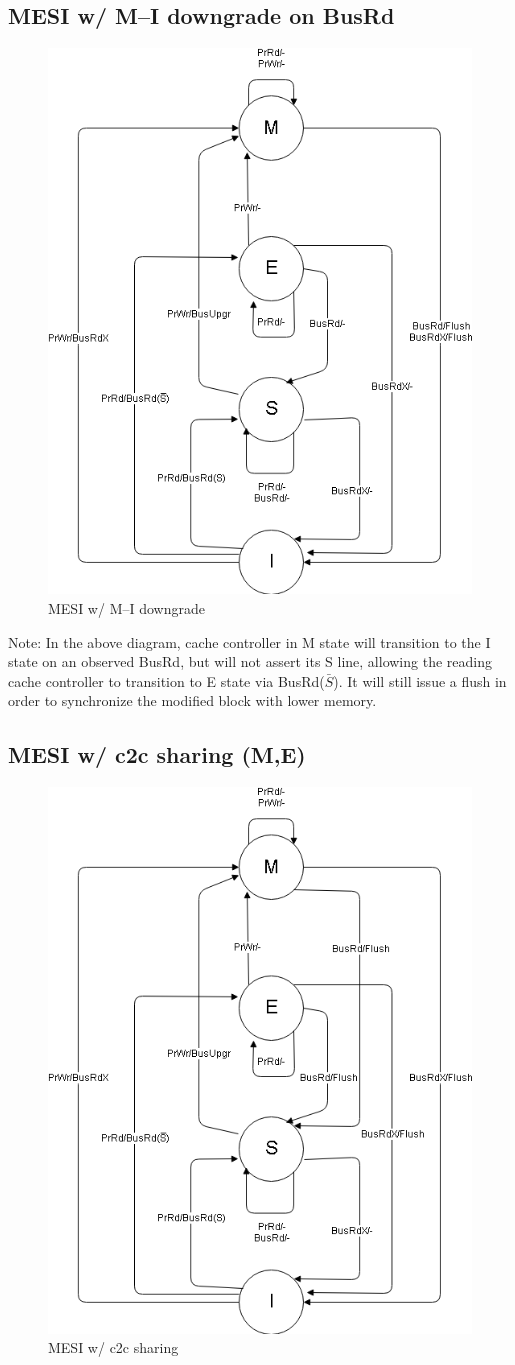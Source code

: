 \documentclass[12pt, letterpaper]{report}
\begin{document}
\subsection{MESI w/ M--I downgrade on BusRd}

\begin{figure}[H]
	\centering
	\includegraphics[width=0.4\columnwidth]{mesi_no_c2c_mi.png}
	\caption{MESI w/ M--I downgrade}
\end{figure}

Note: In the above diagram, cache controller in M state will transition to the I state on an observed BusRd, but will not assert its S line, allowing the reading cache controller to transition to E state via BusRd($\bar{S}$). It will still issue a flush in order to synchronize the modified block with lower memory.

\subsection{MESI w/ c2c sharing (M,E)}

\begin{figure}[H]
	\centering
	\includegraphics[width=0.4\columnwidth]{mesi_c2c.png}
	\caption{MESI w/ c2c sharing}
\end{figure}
\end{document}
